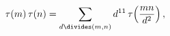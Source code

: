 \[\mathop{\tau\/}\nolimits\!\left(m\right)\mathop{\tau\/}\nolimits\!\left(n%
\right)=\sum_{d\divides\left(m,n\right)}d^{11}\mathop{\tau\/}\nolimits\!\left(%
\frac{mn}{d^{2}}\right),\]
